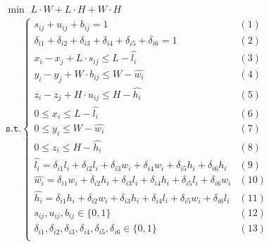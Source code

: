 \begin{eqnarray*}
	\begin{split}
		&\min\,\,  L \cdot W + L \cdot H + W \cdot H\\ 
		&\texttt{s}.\texttt{t}.
		\begin{cases}
			s_{ij}+ u_{ij} + b_{ij}  =1          &(1)  \\ %
			{\delta}_{i1} + {\delta}_{i2} + {\delta}_{i3} + {\delta}_{i4} + {\delta}_{i5} + {\delta}_{i6} =1  & (2)   \\ 
			x_i - x_j + L  \cdot  s_{ij}  \le  L - \hat{l_i}                           & (3)  \\ %
			y_i - y_j + W \cdot b_{ij} \le W - \hat{w_i}                        & (4)   \\ %
			z_i - z_j + H \cdot u_{ij} \le  H - \hat{h_i}                                                                                   & (5)    \\ %
			0 \le x_i \le L- \hat{l_i}                                     & (6)\\ %
			0 \le y_i \le W - \hat{w_i}                                 & (7)\\ %
			0 \le z_i \le H - \hat{h_i}                                   & (8)\\ %
			\hat{l_i} = {\delta}_{i1}   l_i + {\delta}_{i2}  l_i + {\delta}_{i3}  w_i + {\delta}_{i4}  w_i + {\delta}_{i5}  h_i + {\delta}_{i6}  h_i& (9)\\   %
			\hat{w_i} = {\delta}_{i1}  w_i +{\delta}_{i2}  h_i +{\delta}_{i3}  l_i +{\delta}_{i4}  h_i +{\delta}_{i5}  l_i +{\delta}_{i6}  w_i& (10)\\ %
			\hat{h_i} =  {\delta}_{i1}  h_i +{\delta}_{i2}  w_i +{\delta}_{i3}  h_i +{\delta}_{i4}  l_i + {\delta}_{i5}  w_i +{\delta}_{i6}  l_i& (11)\\%
			s_{ij} , u_{ij},  b_{ij}  \in \{0,1\}                                                                                                                      & (12)\\%
			{\delta}_{i1}, {\delta}_{i2}, {\delta}_{i3}, {\delta}_{i4}, {\delta}_{i5}, {\delta}_{i6} \in \{0,1\}                                                     &(13)\\
		\end{cases}
	\end{split}
\end{eqnarray*}


